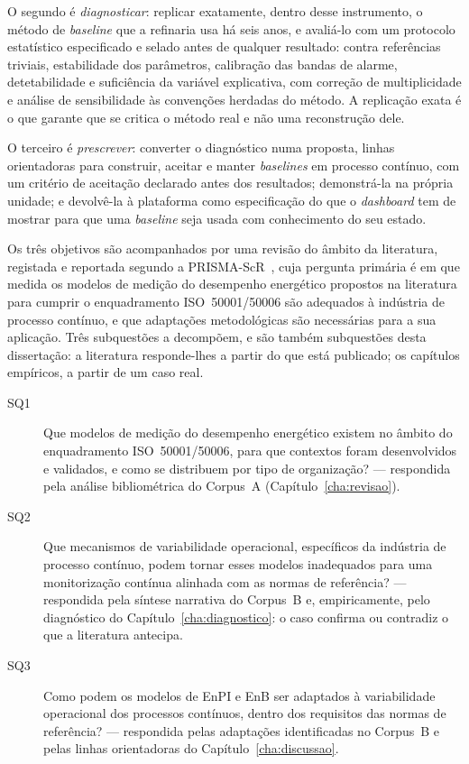 O segundo é \emph{diagnosticar}: replicar exatamente, dentro desse
instrumento, o método de \emph{baseline} que a refinaria usa há seis
anos, e avaliá-lo com um protocolo estatístico especificado e selado
antes de qualquer resultado:  contra
referências triviais, estabilidade dos parâmetros, calibração das bandas de alarme,
detetabilidade e suficiência da variável explicativa, com correção de
multiplicidade e análise de sensibilidade às convenções herdadas do
método. A replicação exata é o que garante que se critica o método real
e não uma reconstrução dele.

O terceiro é \emph{prescrever}: converter o diagnóstico numa proposta,
linhas orientadoras para construir, aceitar e manter \emph{baselines}
em processo contínuo, com um critério de aceitação declarado antes dos
resultados; demonstrá-la na própria unidade; e devolvê-la à plataforma
como especificação do que o \emph{dashboard} tem de mostrar para que uma
\emph{baseline} seja usada com conhecimento do seu estado.

Os três objetivos são acompanhados por uma revisão do
âmbito da literatura, registada e reportada segundo a
PRISMA-ScR~\cite{Tricco2018}, cuja pergunta primária é em que medida os
modelos de medição do desempenho energético propostos na literatura para
cumprir o enquadramento ISO~50001/50006 são adequados à indústria de
processo contínuo, e que adaptações metodológicas são necessárias para a
sua aplicação. Três subquestões a decompõem, e são também subquestões
desta dissertação: a literatura responde-lhes a partir do que está
publicado; os capítulos empíricos, a partir de um caso real.

\begin{description}
  \item[SQ1] Que modelos de medição do desempenho energético existem no
    âmbito do enquadramento ISO~50001/50006, para que contextos foram
    desenvolvidos e validados, e como se distribuem por tipo de
    organização? --- respondida pela análise bibliométrica do Corpus~A
    (Capítulo~\ref{cha:revisao}).
  \item[SQ2] Que mecanismos de variabilidade operacional, específicos da
    indústria de processo contínuo, podem tornar esses modelos
    inadequados para uma monitorização contínua alinhada com as normas
    de referência? --- respondida pela síntese narrativa do Corpus~B e,
    empiricamente, pelo diagnóstico do Capítulo~\ref{cha:diagnostico}: o
    caso confirma ou contradiz o que a literatura antecipa.
  \item[SQ3] Como podem os modelos de EnPI e EnB ser adaptados à
    variabilidade operacional dos processos contínuos, dentro dos
    requisitos das normas de referência? --- respondida pelas
    adaptações identificadas no Corpus~B e pelas linhas orientadoras do
    Capítulo~\ref{cha:discussao}.
\end{description}

